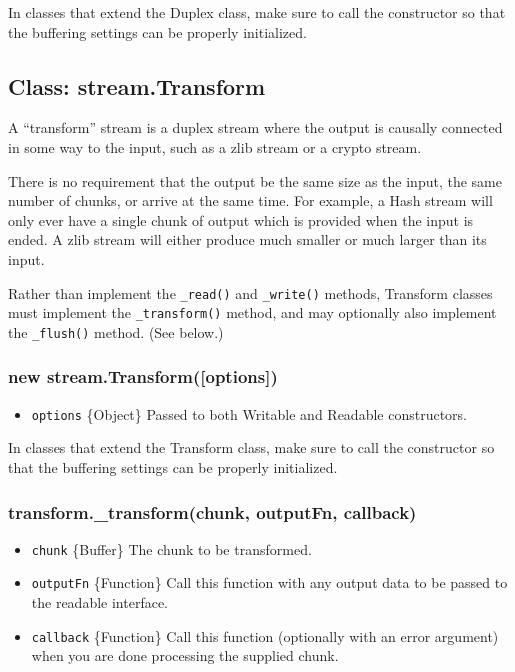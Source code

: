 In classes that extend the Duplex class, make sure to call the
constructor so that the buffering settings can be properly initialized.

\subsection{Class: stream.Transform}

A ``transform'' stream is a duplex stream where the output is causally
connected in some way to the input, such as a zlib stream or a crypto
stream.

There is no requirement that the output be the same size as the input,
the same number of chunks, or arrive at the same time. For example, a
Hash stream will only ever have a single chunk of output which is
provided when the input is ended. A zlib stream will either produce much
smaller or much larger than its input.

Rather than implement the \texttt{\_read()} and \texttt{\_write()}
methods, Transform classes must implement the \texttt{\_transform()}
method, and may optionally also implement the \texttt{\_flush()} method.
(See below.)

\subsubsection{new stream.Transform({[}options{]})}

\begin{itemize}
\item
  \texttt{options} \{Object\} Passed to both Writable and Readable
  constructors.
\end{itemize}

In classes that extend the Transform class, make sure to call the
constructor so that the buffering settings can be properly initialized.

\subsubsection{transform.\_transform(chunk, outputFn, callback)}

\begin{itemize}
\item
  \texttt{chunk} \{Buffer\} The chunk to be transformed.
\item
  \texttt{outputFn} \{Function\} Call this function with any output data
  to be passed to the readable interface.
\item
  \texttt{callback} \{Function\} Call this function (optionally with an
  error argument) when you are done processing the supplied chunk.
\end{itemize}

